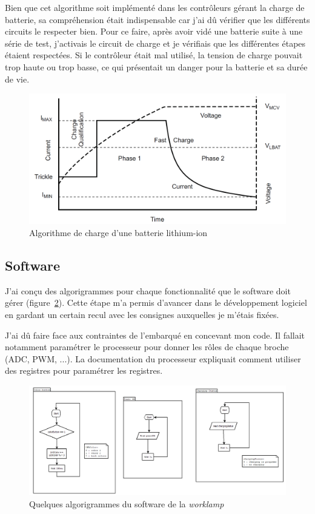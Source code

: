 \documentclass[a4paper, 12pt, sffamily]{report}
\begin{document}
Bien que cet algorithme soit implémenté dans les contrôleurs gérant la charge de batterie, sa compréhension était indispensable car j'ai dû vérifier que les différents circuits le respecter bien. Pour ce faire, après avoir vidé une batterie suite à une série de test, j'activais le circuit de charge et je vérifiais que les différentes étapes étaient respectées. Si le contrôleur était mal utilisé, la tension de charge pouvait trop haute ou trop basse, ce qui présentait un danger pour la batterie et sa durée de vie.



\begin{figure}[H]
\centering
\includegraphics[scale=0.65]{figures/screenshots/Li-ion_charge_algortihm.png}
\caption{Algorithme de charge d’une batterie lithium-ion \cite{BQ2000_datasheet}} 
\label{fig:li-ion_charge}
\end{figure}

\subsection{Software}
J'ai conçu des algorigrammes pour chaque fonctionnalité que le software doit gérer (figure~\ref{fig:flow_chart}). Cette étape m'a permis d'avancer dans le développement logiciel en gardant un certain recul avec les consignes auxquelles je m'étais fixées.

J'ai dû faire face aux contraintes de l'embarqué en concevant mon code. Il fallait notamment paramétrer le processeur pour donner les rôles de chaque broche (ADC, PWM, ...). La documentation du processeur expliquait comment utiliser des registres pour paramétrer les registres. 

\begin{figure}[H]
\centering
\includegraphics[scale=0.7]{figures/screenshots/flow_chart.png}
\caption{Quelques algorigrammes du software de la \emph{worklamp}} 
\label{fig:flow_chart}
\end{figure}
\end{document}
